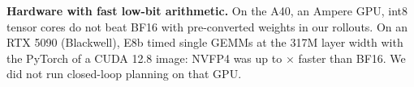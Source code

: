 \textbf{Hardware with fast low-bit arithmetic.} On the A40, an Ampere GPU, int8 tensor cores do not beat BF16 with pre-converted weights in our rollouts. On an RTX 5090 (Blackwell), E8b timed single GEMMs at the 317M layer width with the PyTorch of a CUDA 12.8 image: NVFP4 was up to $\times$ faster than BF16. We did not run closed-loop planning on that GPU.
\clearpage
